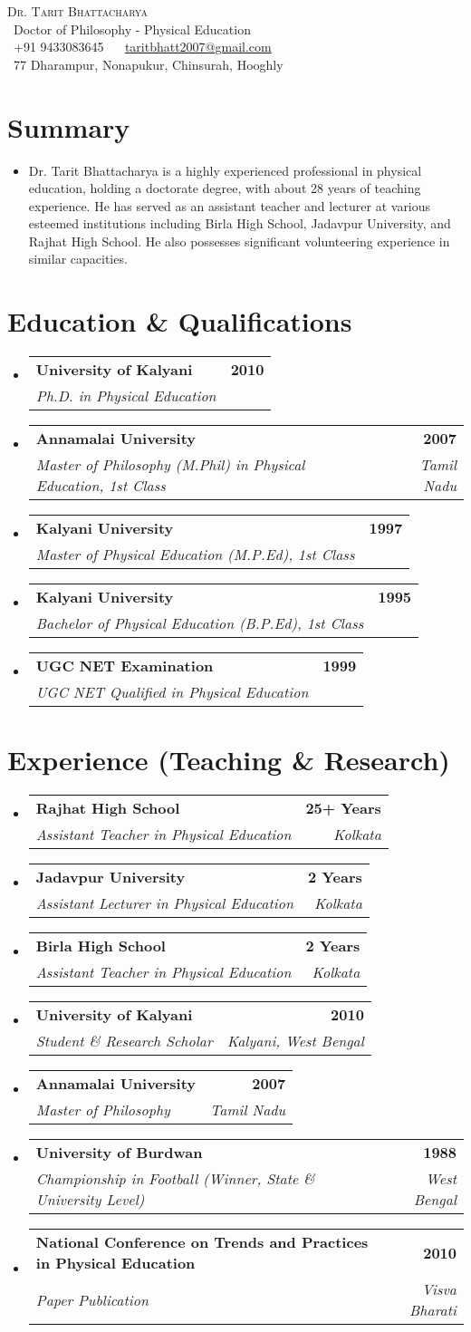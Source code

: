 \documentclass[letterpaper,11pt]{article}
\makeatletter
\newcommand{\resumeItem}[1]{\item\small{{#1 \vspace{0pt}}}}
\newcommand{\resumeSubheading}[4]{
  \vspace{-2pt}\item
    \begin{tabular*}{1.0\textwidth}[t]{l@{\extracolsep{\fill}}r}
      \textbf{#1} & \textbf{\small #2} \\
      \textit{\small#3} & \textit{\small #4} \\
    \end{tabular*}\vspace{-7pt}
}
\newcommand{\resumeSubHeadingListStart}{\begin{itemize}[leftmargin=0.0in, label={}]}
\newcommand{\resumeSubHeadingListEnd}{\end{itemize}\vspace{0pt}}
\makeatother
\begin{document}
\begin{center}
    {\Large \scshape Dr. Tarit Bhattacharya} \\[2mm]
    \faGraduationCap\ Doctor of Philosophy - Physical Education \\[2mm]
    \faPhone\ +91 9433083645 ~ 
    \faEnvelope\ \href{mailto:taritbhatt2007@gmail.com}{taritbhatt2007@gmail.com} \\
    \faMapMarker\ 77 Dharampur, Nonapukur, Chinsurah, Hooghly 
    \vspace{-8pt}
\end{center}

\section{Summary}
  \resumeSubHeadingListStart
    \resumeItem{Dr. Tarit Bhattacharya is a highly experienced professional in physical education, holding a doctorate degree, with about 28 years of teaching experience. He has served as an assistant teacher and lecturer at various esteemed institutions including Birla High School, Jadavpur University, and Rajhat High School. He also possesses significant volunteering experience in similar capacities.}
  \resumeSubHeadingListEnd

\section{Education \& Qualifications}
  \resumeSubHeadingListStart
    \resumeSubheading
      {University of Kalyani}{2010}
      {Ph.D. in Physical Education}{}
    \resumeSubheading
      {Annamalai University}{2007}
      {Master of Philosophy (M.Phil) in Physical Education, 1st Class}{Tamil Nadu}
    \resumeSubheading
      {Kalyani University}{1997}
      {Master of Physical Education (M.P.Ed), 1st Class}{}
    \resumeSubheading
      {Kalyani University}{1995}
      {Bachelor of Physical Education (B.P.Ed), 1st Class}{}
    \resumeSubheading
      {UGC NET Examination}{1999}
      {UGC NET Qualified in Physical Education}{}
  \resumeSubHeadingListEnd

\section{Experience (Teaching \& Research)}
  \resumeSubHeadingListStart
    \resumeSubheading{Rajhat High School}{25+ Years}
      {Assistant Teacher in Physical Education}{Kolkata}
    \resumeSubheading{Jadavpur University}{2 Years}
      {Assistant Lecturer in Physical Education}{Kolkata}
    \resumeSubheading{Birla High School}{2 Years}
      {Assistant Teacher in Physical Education}{Kolkata}
    \resumeSubheading{University of Kalyani}{2010}
      {Student \& Research Scholar}{Kalyani, West Bengal}
    \resumeSubheading{Annamalai University}{2007}
      {Master of Philosophy}{Tamil Nadu}
    \resumeSubheading{University of Burdwan}{1988}
      {Championship in Football (Winner, State \& University Level)}{West Bengal}
    \resumeSubheading{National Conference on Trends and Practices in Physical Education}{2010}
      {Paper Publication}{Visva Bharati}
  \resumeSubHeadingListEnd
\end{document}
